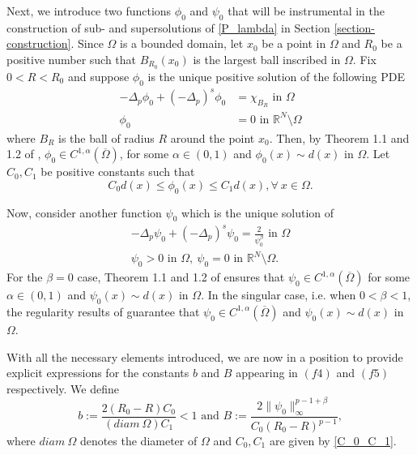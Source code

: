 \documentclass[reqno,oneside]{amsart}
\theoremstyle{definition}
\theoremstyle{remark}
\numberwithin{equation}{section}
\newcommand{\p}{\Delta_p}
\newcommand{\ps}{(-\Delta_p)^s}
\newcommand{\ba}{\beta}
\newcommand{\Om} {\Omega}
\newcommand{\omc}{(\overline{\Om})}
\newcommand{\bdry}{\mathbb{R}^N \setminus \Omega}
\begin{document}
Next, we introduce two functions $\phi_0$ and $\psi_0$ that will be instrumental in the construction of sub- and supersolutions of \eqref{P_lambda} in Section \ref{section-construction}.
Since $\Om$ is a bounded domain, let $x_0$ be a point in $\Om$ and $R_0$ be a positive number such that $B_{R_0} (x_0)$ is the largest ball inscribed in $\Om$. Fix $0<R<R_0$ and suppose $\phi_0$ is the unique positive solution of the following PDE
\begin{equation}\label{phi_0}
    \begin{aligned}
        -\p \phi_0 + \ps \phi_0 &= \chi_{B_R} \text{ in } \Om\\
        \phi_0 &= 0 \text{ in } \bdry
    \end{aligned}
\end{equation}
where $B_R$ is the ball of radius $R$ around the point $x_0$. Then, by Theorem 1.1 and 1.2 of \cite{antonini2025global}, $\phi_0 \in C^{1,\alpha} \omc$, for some $\alpha\in (0,1)$ and $\phi_0 (x) \sim d(x)$ in $\Om$. Let $C_0, C_1$ be positive constants such that
\begin{equation}\label{C_0_C_1}
    C_0 d(x) \leq \phi_0 (x) \leq C_1 d(x), \forall\ x\in\Om.
\end{equation}

Now, consider another function $\psi_0$ which is the unique solution of
\begin{equation}\label{psi_0}
    \begin{aligned}
        -\p \psi_0 + \ps \psi_0 = \frac{2}{\psi_0^{\ba}} \text{ in } \Om\\
        \psi_0 >0 \text{ in } \Om,\ \psi_0 = 0 \text{ in } \bdry.
    \end{aligned}
\end{equation}
For the $\ba=0$ case, Theorem 1.1 and 1.2 of \cite{antonini2025global} ensures that $\psi_0 \in C^{1,\alpha} \omc$ for some $\alpha\in (0,1)$ and $\psi_0 (x) \sim d(x)$ in $\Om$. In the singular case, i.e. when $0<\ba<1$, the regularity results of \cite{dhanya2024interiorboundaryregularitymixed} guarantee that $\psi_0 \in C^{1,\alpha} \omc$ and $\psi_0 (x) \sim d(x)$ in $\Om$.

With all the necessary elements introduced, we are now in a position to provide explicit expressions for the constants $b$ and $B$ appearing in $(f4)$ and $(f5)$ respectively. We define
\begin{equation}\label{b_B}
    b:=\frac{2(R_0 - R)C_0}{(diam\ \Om) C_1} <1 \text{ and } B:= \frac{2\|\psi_0\|_{\infty}^{p-1+\ba}}{C_0 (R_0 -R)^{p-1}},
\end{equation}
where $diam\ \Om$ denotes the diameter of $\Om$ and $C_0, C_1$ are given by \eqref{C_0_C_1}.
\end{document}
